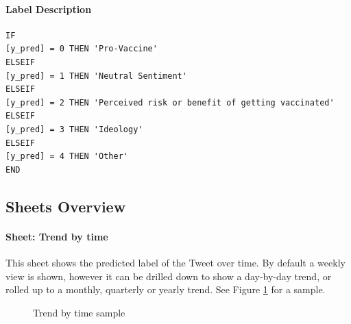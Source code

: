 \documentclass[12pt]{article}
\begin{document}
\paragraph{Label Description}

\begin{verbatim} 
IF
[y_pred] = 0 THEN 'Pro-Vaccine' 
ELSEIF
[y_pred] = 1 THEN 'Neutral Sentiment' 
ELSEIF
[y_pred] = 2 THEN 'Perceived risk or benefit of getting vaccinated' 
ELSEIF
[y_pred] = 3 THEN 'Ideology' 
ELSEIF
[y_pred] = 4 THEN 'Other' 
END

\end{verbatim}

\newpage
\subsection{Sheets Overview}
\paragraph{Sheet: Trend by time}
This sheet shows the predicted label of the Tweet over time. By default a weekly view is shown, however it can be drilled down to show a day-by-day trend, or rolled up to a monthly, quarterly or yearly trend. See Figure \ref{fig:trendbytime} for a sample.

\begin{figure}[tbp]
\begin{center}

\end{center}
\caption{Trend by time sample}
\label{fig:trendbytime}
\end{figure}
\end{document}
